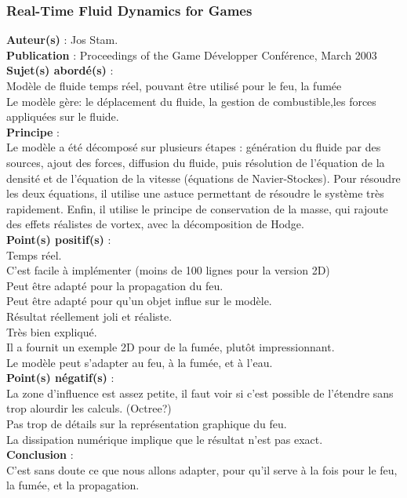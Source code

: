 \documentclass[a4paper,10pt]{article}
\begin{document}
\subsubsection{Real-Time Fluid Dynamics for Games}
\textbf{Auteur(s)} : Jos Stam.\\
\textbf{Publication} : Proceedings of the Game Développer Conférence, March 2003 \\
\textbf{Sujet(s) abordé(s)} : \\
    Modèle de fluide temps réel, pouvant être utilisé pour le feu, la fumée\\
	Le modèle gère: le déplacement du fluide, la gestion de combustible,les forces appliquées sur le fluide.\\	
\textbf{Principe} :\\
	Le modèle a été décomposé sur plusieurs étapes : génération du fluide par des sources, ajout des forces, diffusion du fluide, puis résolution de l'équation de la densité et de l'équation de la vitesse (équations de Navier-Stockes).
	Pour résoudre les deux équations, il utilise une astuce permettant de résoudre le système très rapidement.
	Enfin, il utilise le principe de conservation de la masse, qui rajoute des effets réalistes de vortex, avec la décomposition de Hodge.\\
\textbf{Point(s) positif(s)} :\\
	Temps réel.\\
	C'est facile à implémenter (moins de 100 lignes pour la version 2D)\\
	Peut être adapté pour la propagation du feu.\\
	Peut être adapté pour qu'un objet influe sur le modèle.\\
	Résultat réellement joli et réaliste.\\
	Très bien expliqué.\\
	Il a fournit un exemple 2D pour de la fumée, plutôt impressionnant.\\
	Le modèle peut s'adapter au feu, à la fumée, et à l'eau.\\
\textbf{Point(s) négatif(s)} :\\
	La zone d'influence est assez petite, il faut voir si c'est possible de l'étendre sans trop alourdir les calculs. (Octree?) \\
	Pas trop de détails sur la représentation graphique du feu.\\	
	La dissipation numérique implique que le résultat n'est pas exact.\\
\textbf{Conclusion} :\\
	C'est sans doute ce que nous allons adapter, pour qu'il serve à la fois pour le feu, la fumée, et la propagation.
\end{document}
